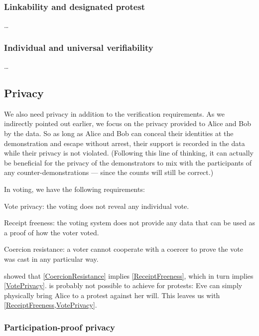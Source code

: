 \subsubsection{Linkability and designated protest}

\dots

\subsubsection{Individual and universal verifiability}

\dots

\subsection{Privacy}%
\label{Privacy}

We also need privacy in addition to the verification requirements.
As we indirectly pointed out earlier, we focus on the privacy provided to Alice 
and Bob by the data.
So as long as Alice and Bob can conceal their identities at the demonstration 
and escape without arrest, their support is recorded in the data while their 
privacy is not violated.
(Following this line of thinking, it can actually be beneficial for the privacy 
of the demonstrators to mix with the participants of any counter-demonstrations 
--- since the counts will still be correct.)

In voting, we have the following requirements:
\begin{requirements}[P]
\item\label{VotePrivacy} Vote privacy: the voting does not reveal any 
  individual vote.
\item\label{ReceiptFreeness} Receipt freeness: the voting system does not 
  provide any data that can be used as a proof of how the voter voted.
\item\label{CoercionResistance} Coercion resistance: a voter cannot cooperate 
  with a coercer to prove the vote was cast in any particular way.
\end{requirements}
 showed that 
\cref{CoercionResistance} implies \cref{ReceiptFreeness}, which in turn implies
\cref{VotePrivacy}.
 is probably not possible to achieve for protests:
\eg Eve can simply physically bring Alice to a protest against her will.
This leaves us with \cref{ReceiptFreeness,VotePrivacy}.

\subsubsection{Participation-proof privacy}

